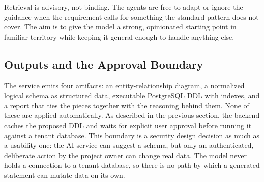 Retrieval is advisory, not binding. The agents are free to adapt or ignore the guidance when the requirement calls for something the standard pattern does not cover. The aim is to give the model a strong, opinionated starting point in familiar territory while keeping it general enough to handle anything else.

\subsection{Outputs and the Approval Boundary}

The service emits four artifacts: an entity-relationship diagram, a normalized logical schema as structured data, executable PostgreSQL DDL with indexes, and a report that ties the pieces together with the reasoning behind them. None of these are applied automatically. As described in the previous section, the backend caches the proposed DDL and waits for explicit user approval before running it against a tenant database. This boundary is a security design decision as much as a usability one: the AI service can suggest a schema, but only an authenticated, deliberate action by the project owner can change real data. The model never holds a connection to a tenant database, so there is no path by which a generated statement can mutate data on its own.
